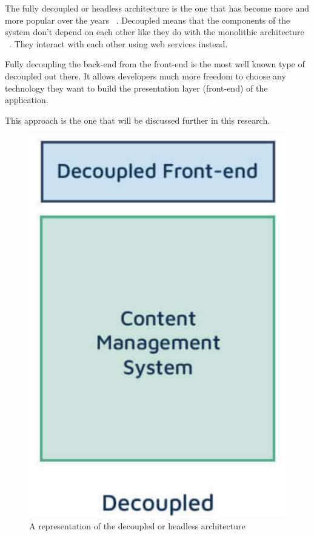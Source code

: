 The fully decoupled or headless architecture is the one that has become more and more popular over the years ~\autocite{Dropsolid2021}. Decoupled means that the components of the system don't depend on each other like they do with the monolithic architecture ~\autocite{So2018}. They interact with each other using web services instead.

Fully decoupling the back-end from the front-end is the most well known type of decoupled out there. It allows developers much more freedom to choose any technology they want to build the presentation layer (front-end) of the application.

This approach is the one that will be discussed further in this research.

\begin{figure}
	\centering
	\includegraphics{./img/Headless_Architecture}
	\caption[Headless CMS architecture]{A representation of the decoupled or headless architecture ~\autocite{Dropsolid2021}}
\end{figure}


